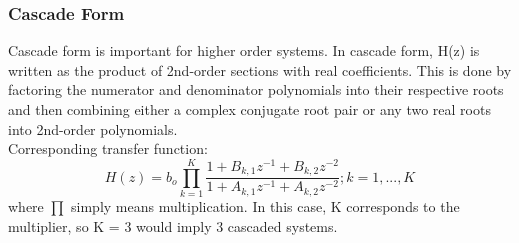 \documentclass{article}
\begin{document}
\newpage
\subsubsection{Cascade Form}
Cascade form is important for higher order systems. In cascade form, H(z) is written as the product of 2nd-order sections with real coefficients. This is done by factoring the numerator and denominator polynomials into their respective roots and then combining either a complex conjugate root pair or any two real roots into 2nd-order polynomials. \\

\vspace{1em}
Corresponding transfer function:
\begin{equation}
H(z) = b_o\prod_{k=1}^{K}\frac{1+B_{k,1}z^{-1}+B_{k,2}z^{-2}}{1+A_{k,1}z^{-1}+A_{k,2}z^{-2}}; k = 1,...,K
\end{equation}
where $\prod$ simply means multiplication. In this case, K corresponds to the multiplier, so K = 3 would imply 3 cascaded systems.
\end{document}
